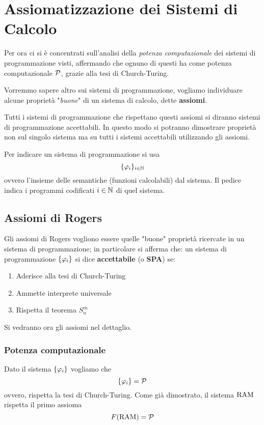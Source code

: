 \section{Assiomatizzazione dei Sistemi di Calcolo}

Per ora ci si è concentrati sull'analisi della \textit{potenza computazionale} dei sistemi di programmazione visti, affermando che ognuno di questi ha come potenza computazionale $\mathcal{P}$, grazie alla tesi di Church-Turing.

Vorremmo sapere altro sui sistemi di programmazione, vogliamo individuare alcune proprietà "\textit{buone}" di un sistema di calcolo, dette \textbf{assiomi}. 

Tutti i sistemi di programmazione che rispettano questi assiomi si diranno sistemi di programmazione accettabili. In questo modo si potranno dimostrare proprietà non sul singolo sistema ma su tutti i sistemi accettabili utilizzando gli assiomi.

Per indicare un sistema di programmazione si usa
$$ \{\varphi_i\}_{i \in \mathbb{N}} $$
ovvero l'insieme delle semantiche (funzioni calcolabili) dal sistema. Il pedice indica i programmi codificati $i \in \mathbb{N}$ di quel sistema.

\subsection{Assiomi di Rogers}

Gli assiomi di Rogers vogliono essere quelle "buone" proprietà ricercate in un sistema di programmazione; in particolare si afferma che: un sistema di programmazione $\{\varphi_i\}$ si dice \textbf{accettabile} (o \textbf{SPA}) se:
\begin{enumerate}
	\item Aderisce alla tesi di Church-Turing
	
    \item Ammette interprete universale
	
    \item Rispetta il teorema $S_n^m$
\end{enumerate}
Si vedranno ora gli assiomi nel dettaglio.

\subsubsection{Potenza computazionale}

Dato il sistema $\{\varphi_i\}$ vogliamo che
$$ \{\varphi_i\} = \mathcal{P} $$
ovvero, rispetta la tesi di Church-Turing. Come già dimostrato, il sistema $\text{RAM}$ rispetta il primo assioma
$$ F(\text{RAM}) = \mathcal{P} $$

